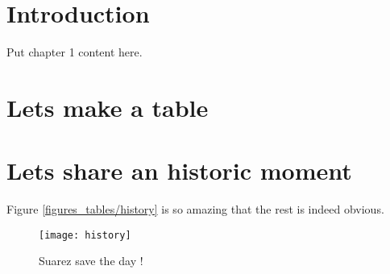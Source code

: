 
\section{Introduction}
Put chapter 1 content here.

\section{Lets make a table} 
 

\section{Lets share an historic moment}

Figure \ref{figures_tables/history} is so amazing  that the rest is indeed obvious.

\begin{figure}[h!tb] \centering
\texttt{[image: history]}
\caption{Suarez save the day !}
\label{history}
\end{figure}
